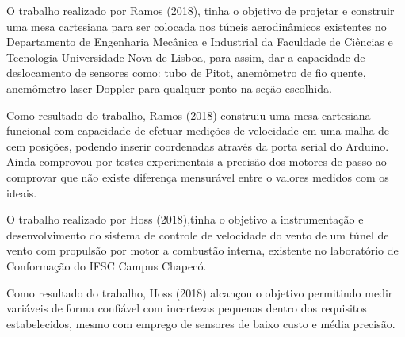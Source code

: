 O trabalho realizado por Ramos (2018), tinha o objetivo de projetar e construir uma mesa cartesiana para ser colocada 
nos túneis aerodinâmicos existentes no Departamento de Engenharia Mecânica e Industrial da Faculdade de Ciências e 
Tecnologia Universidade Nova de Lisboa, para assim, dar a capacidade de deslocamento de sensores como: tubo de Pitot, 
anemômetro de fio quente, anemômetro laser-Doppler para qualquer ponto na seção escolhida.

Como resultado do trabalho, Ramos (2018) construiu uma mesa cartesiana funcional com capacidade de efetuar medições 
de velocidade em uma malha de cem posições, podendo inserir coordenadas através da porta serial do Arduino. Ainda 
comprovou por testes experimentais a precisão dos motores de passo ao comprovar que não existe diferença mensurável 
entre o valores medidos com os ideais.

O trabalho realizado por Hoss (2018),tinha o objetivo a instrumentação e desenvolvimento do sistema de controle de 
velocidade do vento de um túnel de vento com propulsão por motor a combustão interna, existente no laboratório de 
Conformação do IFSC Campus Chapecó.

Como resultado do trabalho, Hoss (2018) alcançou o objetivo permitindo medir variáveis de forma confiável com 
incertezas pequenas dentro dos requisitos estabelecidos, mesmo com emprego de sensores de baixo custo e média precisão.
